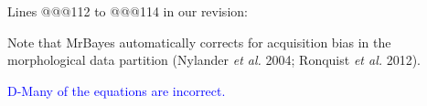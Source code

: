 \documentclass[11pt]{letter}
\begin{document}
\begin{letter}{}
Lines @@@112 to @@@114 in our revision:

\hfill\begin{minipage}{\dimexpr\textwidth-1cm}
Note that MrBayes automatically corrects for acquisition bias in the morphological data partition (Nylander \textit{et al.} 2004; Ronquist \textit{et al.} 2012).
\end{minipage}




\textcolor{blue}{D-Many of the equations are incorrect.}


\end{letter}
\end{document}
